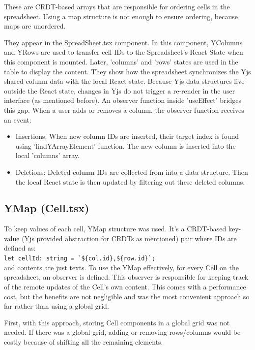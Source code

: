 \documentclass{article}
\begin{document}
These are CRDT-based arrays that are responsible for ordering cells in the spreadsheet. 
Using a map structure is not enough to ensure ordering, because maps are unordered. 

They appear in the SpreadSheet.tsx component. 
In this component, YColumns and YRows are used to transfer cell IDs to the Spreadsheet's React State when this component is mounted. 
Later, 'columns' and 'rows' states are used in the table to display the content. 
They show how the spreadsheet synchronizes the Yjs shared column data with the local React state. 
Because Yjs data structures live outside the React state, changes in Yjs do not trigger a re-render in the user interface (as mentioned before). 
An observer function inside 'useEffect' bridges this gap. When a user adds or removes a column, the observer function receives an event: 

\begin{itemize}
    \item Insertions: When new column IDs are inserted, their target index is found using 'findYArrayElement' function. 
    The new column is inserted into the local 'columns' array.
    \item Deletions: Deleted column IDs are collected from into a data structure. Then the local React state is then updated by filtering out these deleted columns.
\end{itemize}

\subsection{YMap (Cell.tsx)}

To keep values of each cell, YMap structure was used. It's a CRDT-based key-value (Yjs provided abstraction for CRDTs as mentioned) 
pair where IDs are defined as: \\ \verb|let cellId: string = `${col.id},${row.id}`;| \\ and contents are just texts. 
To use the YMap effectively, for every Cell on the spreadsheet, an observer is defined. 
This observer is responsible for keeping track of the remote updates of the Cell's own content. 
This comes with a performance cost, but the benefits are not negligible and was the most convenient approach so far rather than using a global grid. 

First, with this approach, storing Cell components in a global grid was not needed. 
If there was a global grid, adding or removing rows/columns would be costly because of shifting all the remaining elements.
\end{document}
